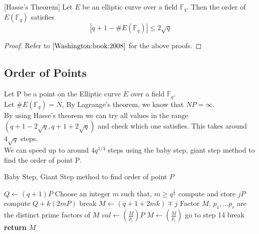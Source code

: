\begin{theorem}{[Hasse's Theorem]}
    Let $E$ be an elliptic curve over a field $\mathbb{F}_q$. Then the order of $E(\mathbb{F}_q)$  satisfies
    \[\left|q + 1 - \#E(\mathbb{F}_q)\right| \leq 2\sqrt{q}\]
\end{theorem}

\begin{proof}
    Refer to $\cite{Washington:book:2008}$ for the above proofs.
\end{proof}
\newpage
\subsection{Order of Points}
Let P be a point on the Elliptic curve $E$ over a field $\mathbb{F}_q$. \\
Let $\#E(\mathbb{F}_q) = N$, By Lagrange's theorem, we know that $NP = \infty$. \\
By using Hasse's theorem we can try all values in the range $(q+1-2\sqrt{q}, q+1+2\sqrt{q})$ and check which one satisfies. This takes around $4\sqrt{q}$ steps.\\
We can speed up to around $4q^{1/4}$ steps using the baby step, giant step method to find the order of point P.

\begin{algorithm}
\caption{Baby Step, Giant Step method to find order of point $P$}\label{BSGS_ORDER}
\begin{algorithmic}[1]
\State $Q\gets (q+1)P$
\State Choose an integer $m$ such that, $m \geq q^{\frac{1}{4}}$
\State compute and store $jP$
\EndFor
{}
\State compute $Q + k(2mP)$
\State break 
\EndIf
\EndFor
\State $M\gets (q + 1 + 2mk) \mp j$
\State Factor $M$, $p_1,...p_r$ are the distinct prime factors of $M$
\State $val \gets (\frac{M}{p_i})P$
\State $M\gets (\frac{M}{p_i})$
\State go to step 14
\Else
\State break
\EndIf
\EndFor
\State \textbf{return} $M$
\EndProcedure
\end{algorithmic}
\end{algorithm}
\newpage
